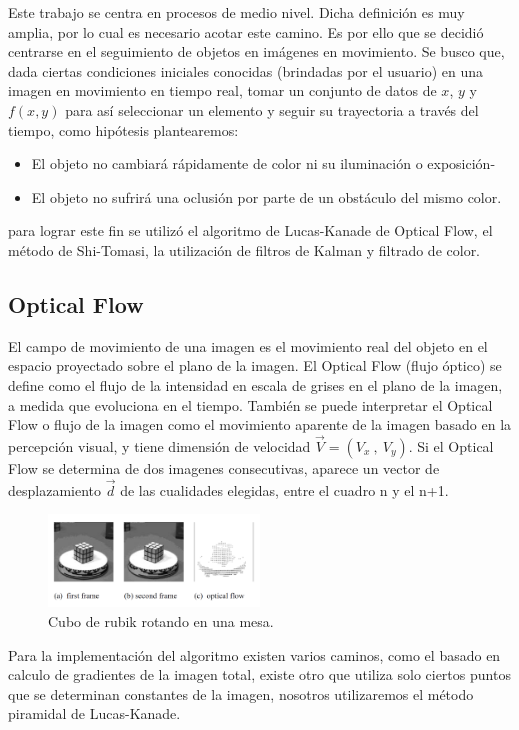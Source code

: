 Este trabajo se centra en procesos de medio nivel. Dicha definición es muy amplia, por lo cual es necesario acotar este camino. Es por ello que se decidió centrarse en el seguimiento de objetos en imágenes en movimiento. Se busco que, dada ciertas condiciones iniciales conocidas (brindadas por el usuario) en una imagen en movimiento en tiempo real, tomar un conjunto de datos de $x$, $y$ y $f(x,y)$ para así seleccionar un elemento y seguir su trayectoria a través del tiempo, como hipótesis plantearemos:
\begin{itemize}
\item El objeto no cambiará rápidamente de color ni su iluminación o exposición-
\item El objeto no sufrirá una oclusión por parte de un obstáculo del mismo color.
\end{itemize} para lograr este fin se utilizó el algoritmo de Lucas-Kanade de Optical Flow, el método de Shi-Tomasi, la utilización de filtros de Kalman y filtrado de color.
\subsection{Optical Flow} 
El campo de movimiento de una imagen es el movimiento real del objeto en el espacio proyectado sobre el plano de la imagen. El Optical Flow (flujo óptico) se define como el flujo de la intensidad en escala de grises en el plano de la imagen, a medida que evoluciona en el tiempo. También se puede interpretar el Optical Flow o flujo de la imagen como el movimiento aparente de la imagen  basado en la percepción visual, y tiene dimensión de velocidad $\vec{V}= (V_x \ , \ V_y)$. Si el Optical Flow se determina de dos imagenes consecutivas, aparece un vector de desplazamiento $\vec{d}$ de las cualidades elegidas, entre el cuadro n y el n+1.
\begin{figure}[H]
		\centering
		\includegraphics[width=0.5\textwidth]{Imagenes/opticalflowrubick.png}
		\caption{Cubo de rubik rotando en una mesa.}
		\label{fig:opticalflow1}
\end{figure}
Para la implementación del algoritmo existen varios caminos, como el basado en calculo de gradientes de la imagen total, existe otro que utiliza solo ciertos puntos que se determinan constantes de la imagen, nosotros utilizaremos el método piramidal de Lucas-Kanade.
